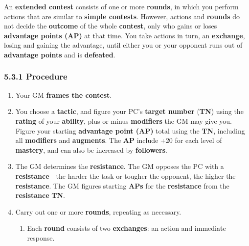 \documentclass[
]{article}
\providecommand{\tightlist}{%
  \setlength{\itemsep}{0pt}\setlength{\parskip}{0pt}}
\begin{document}
An \textbf{extended contest} consists of one or more \textbf{rounds}, in
which you perform actions that are similar to \textbf{simple contests}.
However, actions and \textbf{rounds} do not decide the \textbf{outcome}
of the whole \textbf{contest}, only who gains or loses \textbf{advantage
points (AP)} at that time. You take actions in turn, an
\textbf{exchange}, losing and gaining the advantage, until either you or
your opponent runs out of \textbf{advantage points} and is
\textbf{defeated}.

\hypertarget{procedure-5}{%
\subsubsection{5.3.1 Procedure}\label{procedure-5}}

\begin{enumerate}
\def\labelenumi{\arabic{enumi}.}
\tightlist
\item
  Your GM \textbf{frames the contest}.
\item
  You choose a \textbf{tactic}, and figure your PC's \textbf{target
  number} (\textbf{TN}) using the \textbf{rating} of your
  \textbf{ability}, plus or minus \textbf{modifiers} the GM may give
  you. Figure your starting \textbf{advantage point (AP)} total using
  the \textbf{TN}, including all \textbf{modifiers} and
  \textbf{augments}. The \textbf{AP} include +20 for each level of
  \textbf{mastery}, and can also be increased by \textbf{followers}.
\item
  The GM determines the \textbf{resistance}. The GM opposes the PC with
  a \textbf{resistance}---the harder the task or tougher the opponent,
  the higher the \textbf{resistance}. The GM figures starting
  \textbf{APs} for the \textbf{resistance} from the \textbf{resistance}
  \textbf{TN}.
\item
  Carry out one or more \textbf{rounds}, repeating as necessary.

  \begin{enumerate}
  \def\labelenumii{\arabic{enumii}.}
  \tightlist
  \item
    Each \textbf{round} consists of two \textbf{exchanges}: an action
    and immediate response.


\end{enumerate}
\end{enumerate}
\end{document}

